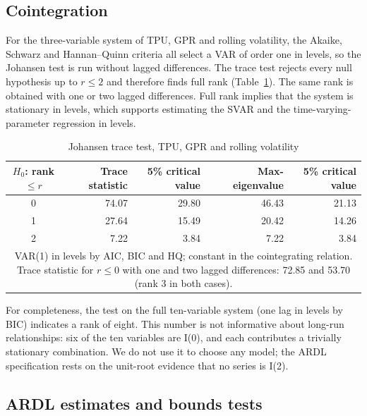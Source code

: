 \documentclass[10pt,twocolumn,a4paper]{article}
\begin{document}
\subsection{Cointegration}

For the three-variable system of TPU, GPR and rolling volatility, the Akaike, Schwarz and Hannan--Quinn criteria all select a VAR of order one in levels, so the Johansen test is run without lagged differences. The trace test rejects every null hypothesis up to $r\le 2$ and therefore finds full rank (Table~\ref{tab:joh}). The same rank is obtained with one or two lagged differences. Full rank implies that the system is stationary in levels, which supports estimating the SVAR and the time-varying-parameter regression in levels.

\begin{table}[!t]\centering\small
\caption{Johansen trace test, TPU, GPR and rolling volatility}\label{tab:joh}
\begin{tabular}{crrrr}
\toprule
$H_0$: rank $\le r$ & Trace statistic & 5\% critical value & Max-eigenvalue & 5\% critical value \\
\midrule
0 & 74.07 & 29.80 & 46.43 & 21.13 \\
1 & 27.64 & 15.49 & 20.42 & 14.26 \\
2 & 7.22 & 3.84 & 7.22 & 3.84 \\
\midrule
\multicolumn{5}{p{0.85\textwidth}}{\footnotesize VAR(1) in levels by AIC, BIC and HQ; constant in the cointegrating relation. Trace statistic for $r\le0$ with one and two lagged differences: 72.85 and 53.70 (rank 3 in both cases).}
\end{tabular}
\end{table}

For completeness, the test on the full ten-variable system (one lag in levels by BIC) indicates a rank of eight. This number is not informative about long-run relationships: six of the ten variables are I(0), and each contributes a trivially stationary combination. We do not use it to choose any model; the ARDL specification rests on the unit-root evidence that no series is I(2).

\subsection{ARDL estimates and bounds tests}
\end{document}
